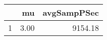 \begin{table}[h]
\centering
\begin{tabular}{rrr}
  \hline
 & mu & avgSampPSec \\ 
  \hline
1 & 3.00 & 9154.18 \\ 
   \hline
\end{tabular}
\end{table}
